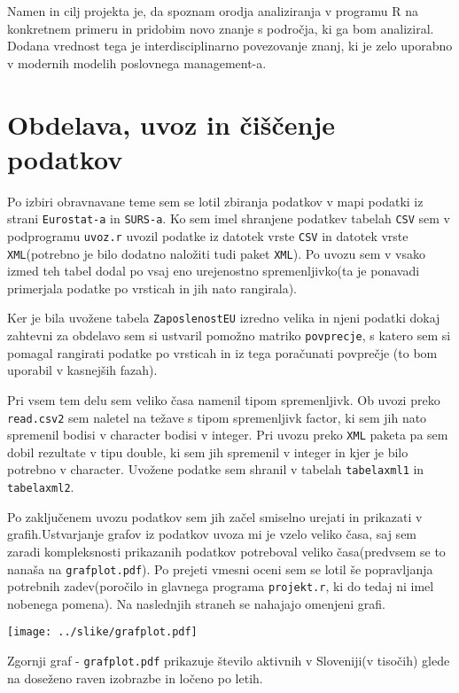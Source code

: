 \documentclass[11pt,a4paper]{article}
\begin{document}
Namen in cilj projekta je, da spoznam orodja analiziranja v programu R na konkretnem primeru in pridobim novo znanje s področja, ki ga bom analiziral. Dodana vrednost tega je interdisciplinarno povezovanje znanj, ki je zelo uporabno v modernih modelih poslovnega management-a.
\pagebreak
\section{Obdelava, uvoz in čiščenje podatkov}

Po izbiri obravnavane teme sem se lotil zbiranja podatkov v mapi podatki iz strani \verb|Eurostat-a| in \verb|SURS-a|. Ko sem imel shranjene podatkev tabelah \verb|CSV| sem v podprogramu \verb|uvoz.r| uvozil podatke iz datotek vrste \verb|CSV| in datotek vrste \verb|XML|(potrebno je bilo dodatno naložiti tudi paket \verb|XML|). Po uvozu sem v vsako izmed teh tabel dodal po vsaj eno urejenostno spremenljivko(ta je ponavadi primerjala podatke po vrsticah in jih nato rangirala). 

Ker je bila uvožene tabela \verb|ZaposlenostEU| izredno velika in njeni podatki dokaj zahtevni za obdelavo sem si ustvaril pomožno matriko \verb|povprecje|, s katero sem si pomagal rangirati podatke po vrsticah in iz tega poračunati povprečje (to bom uporabil v kasnejših fazah).

Pri vsem tem delu sem veliko časa namenil tipom spremenljivk. Ob uvozi preko \verb|read.csv2| sem naletel na težave s tipom spremenljivk factor, ki sem jih nato spremenil bodisi v character bodisi v integer. Pri uvozu preko \verb|XML| paketa pa sem dobil rezultate v tipu double, ki sem jih spremenil v integer in kjer je bilo potrebno v character. Uvožene podatke sem shranil v tabelah \verb|tabelaxml1| in \verb|tabelaxml2|.

Po zaključenem uvozu podatkov sem jih začel smiselno urejati in prikazati v grafih.Ustvarjanje grafov iz podatkov uvoza mi je vzelo veliko časa, saj sem zaradi kompleksnosti prikazanih podatkov potreboval veliko časa(pred\-vsem se to nanaša na \verb|grafplot.pdf|). Po prejeti vmesni oceni sem se lotil še popravljanja potrebnih zadev(poročilo in glavnega programa \verb|projekt.r|, ki do tedaj ni imel nobenega pomena). Na naslednjih straneh se nahajajo omenjeni grafi.

\texttt{[image: ../slike/grafplot.pdf]}

Zgornji graf - \verb|grafplot.pdf| prikazuje število aktivnih v Sloveniji(v tisočih) glede na doseženo raven izobrazbe in ločeno po letih.
\end{document}
